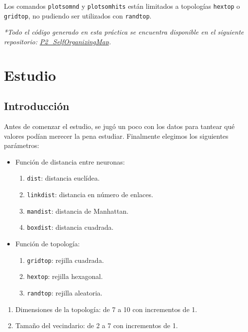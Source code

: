 \documentclass[a4paper,12pt,titlepage]{article}
\begin{document}
Los comandos \lstinline|plotsomnd| y \lstinline|plotsomhits| están limitados a topologías \lstinline|hextop| o \lstinline|gridtop|, no pudiendo ser utilizados con \lstinline|randtop|. 

\emph{*Todo el código generado en esta práctica se encuentra disponible en el siguiente repositorio: 
\href{https://github.com/davidmigloz/neuronal-networks/tree/master/P2\_SelfOrganizingMap}{P2\_SelfOrganizingMap}.}

\section{Estudio}

\subsection{Introducción}
Antes de comenzar el estudio, se jugó un poco con los datos para tantear qué valores podían merecer la pena estudiar. Finalmente elegimos los siguientes parámetros:

\begin{itemize}[noitemsep]
	\item  Función de distancia entre neuronas:
	\begin{enumerate}[noitemsep]
		\item \lstinline|dist|: distancia euclídea.
		\item \lstinline|linkdist|: distancia en número de enlaces.
		\item \lstinline|mandist|: distancia de Manhattan.
		\item \lstinline|boxdist|: distancia cuadrada.
	\end{enumerate}
	\item Función de topología:
	\begin{enumerate}[noitemsep]
		\item \lstinline|gridtop|: rejilla cuadrada.
		\item \lstinline|hextop|: rejilla hexagonal.
		\item \lstinline|randtop|: rejilla aleatoria.
	\end{enumerate}	
\end{itemize}
\begin{enumerate}[noitemsep]
	\item Dimensiones de la topología: de 7 a 10 con incrementos de 1.
	\item Tamaño del vecindario: de 2 a 7 con incrementos de 1.
\end{enumerate}
\end{document}
